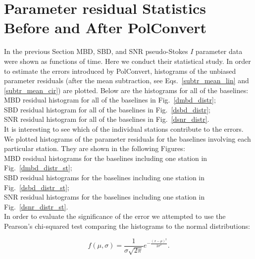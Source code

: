 \documentclass[letterpaper,twoside,12pt]{article}
\begin{document}
\section{Parameter residual Statistics Before and After PolConvert}

In the previous Section MBD, SBD, and SNR pseudo-Stokes $I$ parameter data were shown as functions of time. Here we conduct their statistical study. In order to estimate the errors introduced by PolConvert, histograms of the unbiased parameter residuals (after the mean subtraction, see Eqs.~\eqref{subtr_mean_lin} and \eqref{subtr_mean_cir}) are plotted. Below are the histograms for all of the baselines: \\

\indent MBD residual histogram for all of the baselines in Fig.~\ref{dmbd_distr};  \\
\indent SBD residual histogram for all of the baselines in Fig.~\ref{dsbd_distr};  \\
\indent SNR residual histogram for all of the baselines in Fig.~\ref{dsnr_distr}.  \\

It is interesting to see which of the individual stations contribute to the errors. We plotted histograms of the parameter residuals for the baselines involving each particular station. They are shown in the following Figures: \\

\indent MBD residual histograms for the baselines including one station in Fig.~\ref{dmbd_distr_st};  \\
\indent SBD residual histograms for the baselines including one station in Fig.~\ref{dsbd_distr_st};  \\
\indent SNR residual histograms for the baselines including one station in Fig.~\ref{dsnr_distr_st}.  \\

In order to evaluate the significance of the error we attempted to use the Pearson's chi-squared test comparing the histograms to the normal distributions:

\begin{equation}
  \label{normal_pdf}
  f(\mu,\sigma) =  \frac{1}{\sigma\sqrt{2\pi}} e^{-\frac{(x-\mu)^2}{2\sigma^2}}.
\end{equation}
\end{document}

